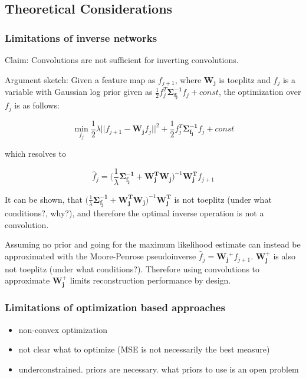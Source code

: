 \documentclass{article}
\begin{document}
\subsection{Theoretical Considerations}



\subsubsection{Limitations of inverse networks}


Claim: Convolutions are not sufficient for inverting convolutions.

Argument sketch: Given a feature map as $f_{j+1}$, where $\bm{W_j}$ is toeplitz and $f_j$ is a variable with Gaussian log prior given as $\frac{1}{2} f_j^T \bm{\Sigma_{f_j}^{-1}}f_j + const$, the optimization over $f_j$ is as follows:

\begin{equation}
	\min_{f_j} \frac{1}{2} \lambda || f_{j+1} - \bm{W_j} f_j ||^2 + \frac{1}{2} f_j^T \bm{\Sigma_{f_j}^{-1}} f_j + const
\end{equation}

which resolves to 

\begin{equation}
\hat{f}_j =  \bigg( \frac{1}{\lambda}  \bm{\Sigma_{f_j}^{-1}} + \bm{W_j^T} \bm{W_j}\bigg)^{-1} \bm{W_j^T} f_{j+1}
\end{equation}

It can be shown, that $\big( \frac{1}{\lambda}  \bm{\Sigma_{f_j}^{-1}} + \bm{W_j^T} \bm{W_j}\big)^{-1} \bm{W_j^T}$ is not toeplitz (under what conditions?, why?), and therefore the optimal inverse operation is not a convolution.

Assuming no prior and going for the maximum likelihood estimate can instead be approximated with the Moore-Penrose pseudoinverse $\hat{f}_j = \bm{W_j}^+ f_{j+1}$. $\bm{W_j^{+}}$ is also not toeplitz (under what conditions?). Therefore using convolutions to approximate $\bm{W_j^{+}}$ limits reconstruction performance by design.


\subsubsection{Limitations of optimization based approaches}

\begin{itemize}
	\item non-convex optimization
	\item not clear what to optimize (MSE is not necessarily the best measure)
	\item underconstrained. priors are necessary. what priors to use is an open problem
\end{itemize}
\end{document}
